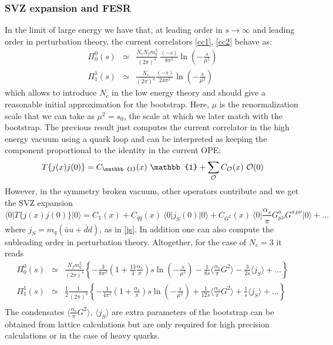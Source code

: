 \documentclass[12pt,letterpaper]{article}
\newcommand{\bra}[1]{\mbox{$\langle #1 |$}}
\newcommand{\ket}[1]{\mbox{$| #1 \rangle$}}
\newcommand{\beq}{\begin{equation}}
\newcommand{\eeq}{\end{equation}}
\newcommand{\beqa}{\begin{eqnarray}}
\newcommand{\eeqa}{\end{eqnarray}}
\newcommand{\cO}{{\cal O}}
\newcommand{\non}{\nonumber}
\newcommand{\half}{\ensuremath{\frac{1}{2}}}
\begin{document}
\subsubsection{SVZ expansion and FESR}   
   
In the limit of large energy we have that, at leading order in $s\rightarrow \infty$ and leading order in perturbation theory, the current correlators \eqref{cc1}, \eqref{cc2} behave as:
   \begin{subequations}
   	\beqa
   	\Pi^0_0(s) &\simeq& \frac{N_c N_f m_q^2}{(2\pi)^4}\  \frac{(-s)}{8\pi^2}\ln(-\frac{s}{\mu^2})  \label{h26} \\
   	\Pi^1_1(s) &\simeq& \frac{N_c}{(2\pi)^4}\frac{(-s)}{24\pi^2}\ln(-\frac{s}{\mu^2})               \label{h27}
   	\eeqa
   \end{subequations}
which allows to introduce $N_c$ in the low energy theory and should give a reasonable initial approximation for the bootstrap. Here, $\mu$ is the renormalization scale that we can take as $\mu^2=s_0$, the scale at which we later match with the bootstrap.  
   The previous result just computes the current correlator in the high energy vacuum using a quark loop and can be interpreted as keeping the component proportional to the identity in the current OPE:
\beq
  T\{j(x) j(0)\} = C_{\mathbb{1}}(x)\ \mathbb{1}  + \sum_\cO C_{\cO}(x)\ \cO(0)   \label{h28}
\eeq   
However, in the symmetry broken vacuum, other operators contribute and we get the SVZ expansion
 \beq\label{svzexp}
\bra{0} T\{j(x) j(0)\} \ket{0} = C_{\mathbb{1}}(x)  +  C_{\bar{q} q}(x)\ \bra{0}j_S(0)\ket{0} + C_{G^2}(x)\ \bra{0} \frac{\alpha_s}{\pi} G_{\mu\nu}^a G^{a\,\mu\nu} \ket{0} + \ldots
 \eeq   
where $j_S=m_q(\bar{u}u+\bar{d}d)$, as in \eqref{js}.
In addition one can also compute the subleading order in perturbation theory. Altogether, for the case of $N_c=3$ it reads \cite{SHIFMAN1979385,Reinders:1981bq} 
   \beqa
    \Pi^0_0(s) &\simeq& \frac{N_f m_q^2}{(2\pi)^4}  \left\{-\frac{3}{8\pi^2}\left(1+\frac{13}{3}\frac{\alpha_s}{\pi}\right)s\ln(-\frac{s}{\mu^2}) - \frac{1}{8s} \langle\frac{\alpha_s}{\pi}G^2\rangle - \frac{3}{2s}\langle j_S\rangle+\ldots \right\} \non\\
   \Pi^1_1(s) &\simeq& \half\frac{1}{(2\pi)^4}  \left\{-\frac{1}{4\pi^2}\left(1+\frac{\alpha_s}{\pi}\right)s\ln(-\frac{s}{\mu^2}) + \frac{1}{12s} \langle\frac{\alpha_s}{\pi}G^2\rangle + \frac{1}{s}\langle j_S\rangle +\ldots \right\} \non \\  \label{h29}
   \eeqa
The condensates $\langle\frac{\alpha_s}{\pi}G^2\rangle$, $\langle j_S\rangle $ are extra parameters of the bootstrap can be obtained from lattice calculations but are only required for high precision calculations or in the case of heavy quarks.
\end{document}
